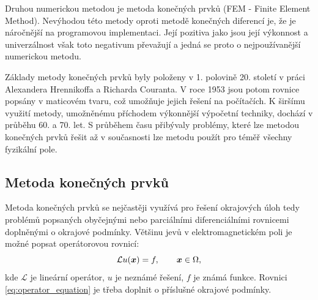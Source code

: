 \documentclass[12pt,a4paper,oneside]{article}
\numberwithin{equation}{section} %
\numberwithin{figure}{section} %
\numberwithin{table}{section} %
\renewcommand{\vec}[1]{\mbox{\boldmath$#1$}} %
\begin{document}
Druhou numerickou metodou je metoda konečných prvků (FEM - Finite Element Method). Nevýhodou této metody oproti metodě konečných diferencí je, že je náročnější na programovou implementaci. Její pozitiva jako jsou její výkonnost a univerzálnost však toto negativum převažují a jedná se proto o nejpoužívanější numerickou metodu. 

Základy metody konečných prvků byly položeny v 1. polovině 20. století v práci Alexandera Hrennikoffa a Richarda Couranta. V roce 1953 jsou potom rovnice popsány v maticovém tvaru, což umožňuje jejich řešení na počítačích. K širšímu využití metody, umožněnému příchodem výkonnější výpočetní techniky, dochází v průběhu 60. a 70. let. S průběhem času přibývaly problémy, které lze metodou konečných prvků řešit až v současnosti lze metodu použít pro téměř všechny fyzikální pole. \cite{FEM}


\subsection{Metoda konečných prvků}
\label{FEM}
Metoda konečných prvků se nejčastěji využívá pro řešení okrajových úloh tedy problémů popsaných  obyčejnými nebo parciálními diferenciálními rovnicemi doplněnými o okrajové podmínky.
Většinu jevů v elektromagnetickém poli je možné popsat operátorovou rovnicí:
\begin{equation}
\mathcal{L}u(\vec{x}) = f,  \qquad \vec{x} \in \Omega,
\label{eq:operator_equation}
\end{equation} 
kde $\mathcal{L}$ je lineární operátor, $u$ je neznámé řešení, $f$ je známá funkce. Rovnici \ref{eq:operator_equation} je třeba doplnit o příslušné okrajové podmínky.
\end{document}
